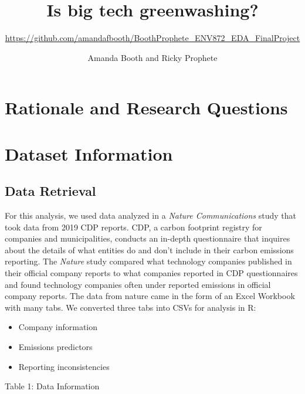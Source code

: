 \documentclass[
  12pt,
]{article}
\title{Is big tech greenwashing?}
\subtitle{\url{https://github.com/amandafbooth/BoothProphete_ENV872_EDA_FinalProject}}
\author{Amanda Booth and Ricky Prophete}
\date{}
\providecommand{\tightlist}{%
  \setlength{\itemsep}{0pt}\setlength{\parskip}{0pt}}
\begin{document}
\maketitle

\newpage
\tableofcontents 
\newpage
\listoftables 
\newpage
\listoffigures 
\newpage

\hypertarget{rationale-and-research-questions}{%
\section{Rationale and Research
Questions}\label{rationale-and-research-questions}}

\newpage

\hypertarget{dataset-information}{%
\section{Dataset Information}\label{dataset-information}}

\hypertarget{data-retrieval}{%
\subsection{Data Retrieval}\label{data-retrieval}}

For this analysis, we used data analyzed in a \emph{Nature
Communications} study that took data from 2019 CDP reports. CDP, a
carbon footprint registry for companies and municipalities, conducts an
in-depth questionnaire that inquires about the details of what entities
do and don't include in their carbon emissions reporting. The
\emph{Nature} study compared what technology companies published in
their official company reports to what companies reported in CDP
questionnaires and found technology companies often under reported
emissions in official company reports. The data from nature came in the
form of an Excel Workbook with many tabs. We converted three tabs into
CSVs for analysis in R:

\begin{itemize}
\tightlist
\item
  Company information
\item
  Emissions predictors
\item
  Reporting inconsistencies
\end{itemize}

Table 1: Data Information
\end{document}
